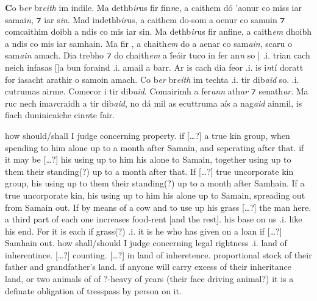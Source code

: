 \documentclass[11pt]{article}
\begin{document}
\begin{pages}
  \Pages

  \begin{Leftside}
    \beginnumbering
    \pstart
    \textbf{C}o b\emph{er} br\emph{eith} im indile. Ma dethb\emph{ir}us fir fin\emph{n}e, a caithem d\'{o} 'aonur co miss iar samai\emph{n}, ⁊  iar s\emph{in}.  Mad indethb\emph{ir}us, a caithem do-som a oenur co samuin ⁊ comcaithim doibh a ndis co mis iar sin.  Ma dethb\emph{ir}us fir anfine, a caith\emph{em} dhoibh a ndis co mis iar samhain.  Ma  fir , a chaith\emph{em} do a aenar co sam\emph{ain}, scaru o sam\emph{ain} amach.  Dia trebho ⁊ do chaith\emph{em} a \.{f}e\'{o}ir tuco in fer an\emph{n} so | .i. trian cach neich infasas [\hspace{2mm}]a bun foraind .i. amail a barr.  Ar is cach dia feor .i. is i\emph{n}t\'{i} doratt for iasacht  arathir o samoin amach.  Co b\emph{er} br\emph{eith} im techta .i. tir dib\emph{aid} so.   .i. cutrumas airme.  Comecor i tir dib\emph{aid}.  Comairimh a fer\emph{ann} ath\emph{ar} ⁊ senath\emph{ar}.  Ma ruc nech ima\emph{r}craidh a tir dib\emph{aid}, no d\'{a} mil as ecuttruma a\'{i}s a nag\emph{aid} ainmil, is fiach duninicaiche cin\emph{n}te fair.
    \pend
  \endnumbering
  \end{Leftside}

\begin{Rightside}
    \beginnumbering
    \pstart
    how should/shall I judge concerning property. if [\ldots?] a true kin group, when spending to him alone up to a month after Samain, and seperating after that. if it may be [\ldots?] his using up to him his alone to Samain, together using up to them their standing(?) up to a month after that.  If [\ldots?] true uncorporate kin group, his using up to them their standing(?) up to a month after Samhain.  If a true uncorporate kin, his using up to him his alone up to Samain, spreading out from Samain out.  If by means of a cow and to use up his grass [\ldots?] the man here.  a third part of each one increases food-rent [and the rest].\hspace{2mm} his base on us .i. like his end. For it is each if grass(?) .i. it is he who has given on a loan if [\ldots?] Samhain out.  how shall/should I judge concerning legal rightness .i. land of inherentince.  [\ldots?] counting.  [\ldots?] in land of inheretence.  proportional stock of their father and grandfather's land. if anyone will carry excess of their inheritance land, or two animals of of ?-heavy of years (their face driving animal?) it is a definate obligation of tresspass by person on it. 
    \pend
    \endnumbering
  \end{Rightside}


\end{pages}
\end{document}
